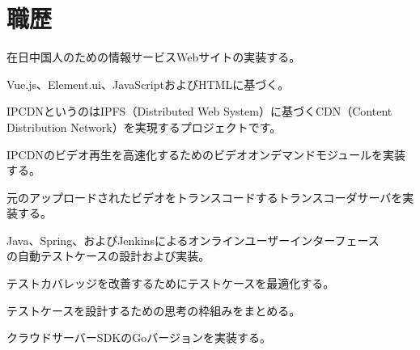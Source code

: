 \documentclass[]{deedy-resume-openfont}
\begin{document}
\hfill
\begin{minipage}[t]{0.73\textwidth} 


\section{職歴}
\vspace{\topsep}
\begin{tightemize}
    \item 在日中国人のための情報サービスWebサイトの実装する。
    \item Vue.js、Element.ui、JavaScriptおよびHTMLに基づく。
\end{tightemize}
\sectionsep

\begin{tightemize}
    \item IPCDNというのはIPFS（Distributed Web System）に基づくCDN（Content Distribution Network）を実現するプロジェクトです。
    \item IPCDNのビデオ再生を高速化するためのビデオオンデマンドモジュールを実装する。
    \item 元のアップロードされたビデオをトランスコードするトランスコーダサーバを実装する。
\end{tightemize}
\sectionsep

\begin{tightemize}
\item Java、Spring、およびJenkinsによるオンラインユーザーインターフェース \\ の自動テストケースの設計および実装。
\item テストカバレッジを改善するためにテストケースを最適化する。
\item テストケースを設計するための思考の枠組みをまとめる。
\end{tightemize}
\sectionsep

\begin{tightemize}
\item クラウドサーバーSDKのGoバージョンを実装する。
\end{tightemize}


\end{minipage}
\end{document}
